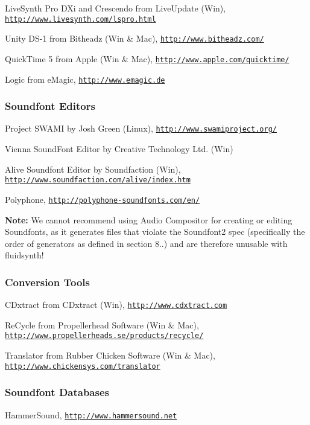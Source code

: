 \begin{DoxyItemize}
\item Live\+Synth Pro D\+Xi and Crescendo from Live\+Update (Win), \href{http://www.livesynth.com/lspro.html}{\tt http\+://www.\+livesynth.\+com/lspro.\+html}
\item Unity D\+S-\/1 from Bitheadz (Win \& Mac), \href{http://www.bitheadz.com/}{\tt http\+://www.\+bitheadz.\+com/}
\item Quick\+Time 5 from Apple (Win \& Mac), \href{http://www.apple.com/quicktime/}{\tt http\+://www.\+apple.\+com/quicktime/}
\item Logic from e\+Magic, \href{http://www.emagic.de}{\tt http\+://www.\+emagic.\+de}
\end{DoxyItemize}

\subsubsection*{Soundfont Editors}


\begin{DoxyItemize}
\item Project S\+W\+A\+MI by Josh Green (Linux), \href{http://www.swamiproject.org/}{\tt http\+://www.\+swamiproject.\+org/}
\item Vienna Sound\+Font Editor by Creative Technology Ltd. (Win)
\item Alive Soundfont Editor by Soundfaction (Win), \href{http://www.soundfaction.com/alive/index.htm}{\tt http\+://www.\+soundfaction.\+com/alive/index.\+htm}
\item Polyphone, \href{http://polyphone-soundfonts.com/en/}{\tt http\+://polyphone-\/soundfonts.\+com/en/}

{\bfseries Note\+:} We cannot recommend using Audio Compositor for creating or editing Soundfonts, as it generates files that violate the Soundfont2 spec (specifically the order of generators as defined in section 8..) and are therefore unusable with fluidsynth!
\end{DoxyItemize}

\subsubsection*{Conversion Tools}


\begin{DoxyItemize}
\item C\+Dxtract from C\+Dxtract (Win), \href{http://www.cdxtract.com}{\tt http\+://www.\+cdxtract.\+com}
\item Re\+Cycle from Propellerhead Software (Win \& Mac), \href{http://www.propellerheads.se/products/recycle/}{\tt http\+://www.\+propellerheads.\+se/products/recycle/}
\item Translator from Rubber Chicken Software (Win \& Mac), \href{http://www.chickensys.com/translator}{\tt http\+://www.\+chickensys.\+com/translator}
\end{DoxyItemize}

\subsubsection*{Soundfont Databases}


\begin{DoxyItemize}
\item Hammer\+Sound, \href{http://www.hammersound.net}{\tt http\+://www.\+hammersound.\+net} 
\end{DoxyItemize}